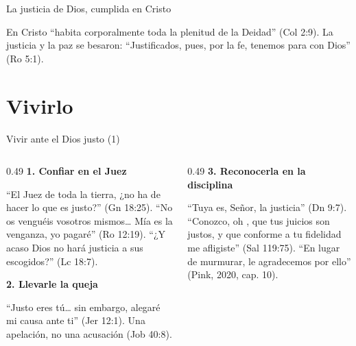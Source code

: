 \begin{frame}{La justicia de Dios, cumplida en Cristo}
\centering
{}\par\bigskip
\small En Cristo ``habita corporalmente toda la plenitud de la Deidad'' (Col 2:9). La justicia y la paz se besaron: ``Justificados, pues, por la fe, tenemos  para con Dios'' (Ro 5:1).
\end{frame}

\section{Vivirlo}

\begin{frame}{Vivir ante el Dios justo (1)}
\begin{columns}[t,onlytextwidth]
\begin{column}{0.49\textwidth}
\textbf{\color{azul}1. Confiar en el Juez}\par\small
``El Juez de toda la tierra, ¿no ha de hacer lo que es justo?'' (Gn 18:25). ``No os venguéis vosotros mismos\ldots{} Mía es la venganza, yo pagaré'' (Ro 12:19). ``¿Y acaso Dios no hará justicia a sus escogidos?'' (Lc 18:7).\par\medskip
\textbf{\color{azul}2. Llevarle la queja}\par\small
``Justo eres tú\ldots{} sin embargo, alegaré mi causa ante ti'' (Jer 12:1). Una apelación, no una acusación (Job 40:8).
\end{column}
\begin{column}{0.49\textwidth}
\textbf{\color{azul}3. Reconocerla en la disciplina}\par\small
``Tuya es, Señor, la justicia'' (Dn 9:7). ``Conozco, oh \SENOR, que tus juicios son justos, y que conforme a tu fidelidad me afligiste'' (Sal 119:75). ``En lugar de murmurar, le agradecemos por ello'' (Pink, 2020, cap. 10).
\end{column}
\end{columns}
\end{frame}

